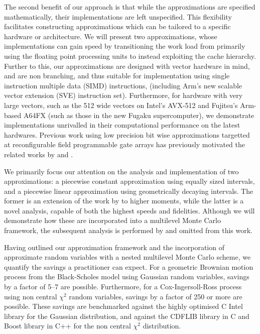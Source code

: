\documentclass[manuscript,review]{acmart}
\begin{document}
The second benefit of our approach is that while the approximations are  specified mathematically, their implementations are left unspecified. This flexibility facilitates constructing approximations which can be tailored to a specific hardware or architecture. We will present two approximations, whose implementations can gain speed by transitioning the work load from primarily using the floating point processing units to instead exploiting the cache hierarchy. Further to this, our approximations are designed with vector hardware in mind, and are non branching, and thus suitable for implementation using single instruction multiple data (SIMD) instructions, (including Arm's new scalable vector extension (SVE) instruction set). Furthermore, for hardware with very large vectors, such as the \SI{512}{\bit} wide vectors on Intel's AVX-512 and Fujitsu's Arm-based A64FX (such as those in the new Fugaku supercomputer), we demonstrate implementations unrivalled in their computational performance on the latest hardwares. Previous work using low precision bit wise approximations targetted at reconfigurable field programmable gate arrays has previously motivated the related works by \citet{brugger2014mixed} and \citet{omland2015exploiting}.

We primarily focus our attention on the analysis and implementation of two approximations: a piecewise constant approximation using equally sized intervals, and a piecewise linear approximation using geometrically decaying intervals. The former is an extension of the work by \citet[theorem~1]{giles2019random_quadrature} to higher moments, while the latter is a novel analysis, capable of both the highest speeds and fidelities. Although we will demonstrate how these are incorporated into a multilevel Monte Carlo framework, the subsequent analysis is performed by \citeauthor{giles2020approximate} \citep{giles2020approximate,sheridan2020nested} and omitted from this work. 

Having outlined our approximation framework and the incorporation of approximate random variables with a nested multilevel Monte Carlo scheme, we quantify the savings a practitioner can expect. For a geometric Brownian motion process from the Black-Scholes model \citep{black1973pricing} using Gaussian random variables, savings by a factor of 5--7 are possible. Furthermore, for a Cox-Ingersoll-Ross process \citep{cox1985theory} using non central $ \chi^2 $ random variables, savings by a factor of 250 or more are possible. These savings are benchmarked against the highly optimised C Intel library for the Gaussian distribution, and against the CDFLIB library \citep{brown1994dcdflib,burkardt2020cdflib} in C and Boost library \citep{boost2020library} in C++ for the non central $ \chi^2 $ distribution. 
\end{document}
